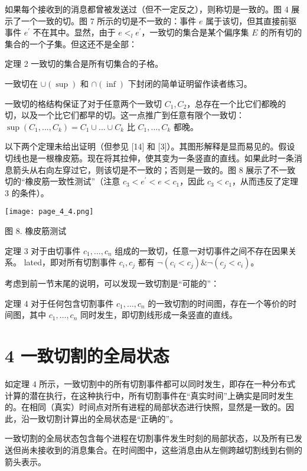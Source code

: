 \documentclass[12pt,a4paper]{report} %
\begin{document}
如果每个接收到的消息都曾被发送过（但不一定反之），则称切是一致的。图 4 展示了一个一致的切。图 7 所示的切是不一致的：事件 $e$ 属于该切，但其直接前驱事件 $e^{\prime}$ 不在其中。显然，由于 $e<_{l} e^{\prime}$，一致切的集合是某个偏序集 $E$ 的所有切的集合的一个子集。但这还不是全部：

定理 2 一致切的集合是所有切集合的子格。

一致切在 $\cup(\sup)$ 和 $\cap(\inf)$ 下封闭的简单证明留作读者练习。

一致切的格结构保证了对于任意两个一致切 $C_{1}, C_{2}$，总存在一个比它们都晚的切，以及一个比它们都早的切。这一点推广到任意有限个一致切：$\sup(C_{1}, \ldots, C_{k}) = C_{1} \cup \ldots \cup C_{k}$ 比 $C_{1}, \ldots, C_{k}$ 都晚。

以下两个定理未给出证明（但参见 [14] 和 [3]）。其图形解释是显而易见的。假设切线也是一根橡皮筋。现在将其拉伸，使其变为一条竖直的直线。如果此时一条消息箭头从右向左穿过它，则该切是不一致的；否则是一致的。图 8 展示了不一致切的“橡皮筋一致性测试”（注意 $c_{3}<e^{\prime}<e<c_{1}$，因此 $c_{3}<c_{1}$，从而违反了定理 3 的条件）。

\begin{center}
\texttt{[image: page\_4\_4.png]}
\end{center}
\begin{center}
图 8. 橡皮筋测试
\end{center}

定理 3 对于由切事件 $c_{1}, \ldots, c_{n}$ 组成的一致切，任意一对切事件之间不存在因果关系。
lated，即对所有切割事件 $c_i, c_j$ 都有 $\neg(c_i < c_j) \& \neg(c_j < c_i)$。

考虑到前一节末尾的说明，可以发现一致切割是“可能的”：

定理 4 对于任何包含切割事件 $c_1, \ldots, c_n$ 的一致切割的时间图，存在一个等价的时间图，其中 $c_1, \ldots, c_n$ 同时发生，即切割线形成一条竖直的直线。

\section*{4 一致切割的全局状态}

如定理 4 所示，一致切割中的所有切割事件都可以同时发生，即存在一种分布式计算的潜在执行，在这种执行中，所有切割事件在“真实时间”上确实是同时发生的。在相同（真实）时间点对所有进程的局部状态进行快照，显然是一致的。因此，沿一致切割计算出的全局状态是“正确的”。

一致切割的全局状态包含每个进程在切割事件发生时刻的局部状态，以及所有已发送但尚未接收到的消息集合。在时间图中，这些消息由从左侧跨越切割线到右侧的箭头表示。
\end{document}
